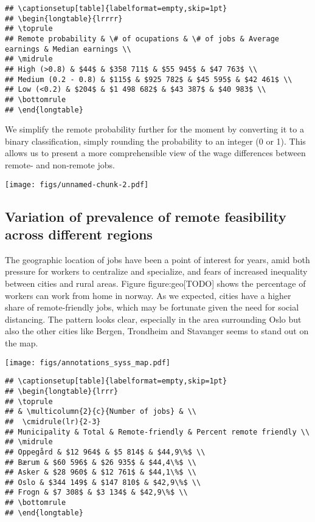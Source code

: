 \documentclass[11pt,]{article}
\begin{document}
\begin{verbatim}
## \captionsetup[table]{labelformat=empty,skip=1pt}
## \begin{longtable}{lrrrr}
## \toprule
## Remote probability & \# of ocupations & \# of jobs & Average earnings & Median earnings \\ 
## \midrule
## High (>0.8) & $44$ & $358 711$ & $55 945$ & $47 763$ \\ 
## Medium (0.2 - 0.8) & $115$ & $925 782$ & $45 595$ & $42 461$ \\ 
## Low (<0.2) & $204$ & $1 498 682$ & $43 387$ & $40 983$ \\ 
## \bottomrule
## \end{longtable}
\end{verbatim}

We simplify the remote probability further for the moment by converting
it to a binary classification, simply rounding the probability to an
integer (0 or 1). This allows us to present a more comprehensible view
of the wage differences between remote- and non-remote jobs.

\texttt{[image: figs/unnamed-chunk-2.pdf]}

\hypertarget{variation-of-prevalence-of-remote-feasibility-across-different-regions}{%
\subsection{Variation of prevalence of remote feasibility across
different
regions}\label{variation-of-prevalence-of-remote-feasibility-across-different-regions}}

The geographic location of jobs have been a point of interest for years,
amid both pressure for workers to centralize and specialize, and fears
of increased inequality between cities and rural areas. Figure
figure:geo{[}TODO{]} shows the percentage of workers can work from home
in norway. As we expected, cities have a higher share of remote-friendly
jobs, which may be fortunate given the need for social distancing. The
pattern looks clear, especially in the area surrounding Oslo but also
the other cities like Bergen, Trondheim and Stavanger seems to stand out
on the map.

\texttt{[image: figs/annotations\_syss\_map.pdf]}

\begin{verbatim}
## \captionsetup[table]{labelformat=empty,skip=1pt}
## \begin{longtable}{lrrr}
## \toprule
## & \multicolumn{2}{c}{Number of jobs} & \\ 
##  \cmidrule(lr){2-3}
## Municipality & Total & Remote-friendly & Percent remote friendly \\ 
## \midrule
## Oppegård & $12 964$ & $5 814$ & $44,9\%$ \\ 
## Bærum & $60 596$ & $26 935$ & $44,4\%$ \\ 
## Asker & $28 960$ & $12 761$ & $44,1\%$ \\ 
## Oslo & $344 149$ & $147 810$ & $42,9\%$ \\ 
## Frogn & $7 308$ & $3 134$ & $42,9\%$ \\ 
## \bottomrule
## \end{longtable}
\end{verbatim}
\end{document}
